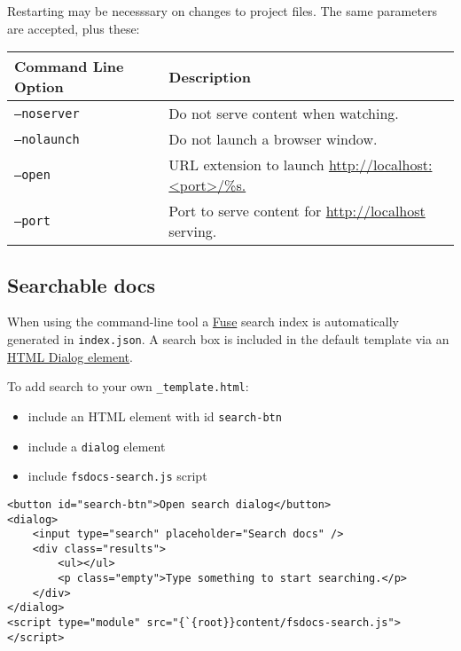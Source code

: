 \documentclass{article}
\begin{document}
Restarting may be necesssary on changes to project files. The same parameters are accepted, plus these:
\begin{tabular}{|l|l|}\hline
\textbf{Command Line Option} & \textbf{Description}\\ \hline\hline
\texttt{--noserver} & Do not serve content when watching.\\ \hline
\texttt{--nolaunch} & Do not launch a browser window.\\ \hline
\texttt{--open} & URL extension to launch \href{http://localhost:<port>/\%s.}{http://localhost:<port>/\%s.}\\ \hline
\texttt{--port} & Port to serve content for \href{http://localhost}{http://localhost} serving.\\ \hline
\end{tabular}

\subsection*{Searchable docs}



When using the command-line tool a \href{https://www.fusejs.io/}{Fuse} search index is automatically generated in \texttt{index.json}.
A search box is included in the default template via an \href{https://developer.mozilla.org/docs/Web/HTML/Element/dialog}{HTML Dialog element}.

To add search to your own \texttt{\_template.html}:
\begin{itemize}
\item include an HTML element with id \texttt{search-btn}

\item include a \texttt{dialog} element

\item include \texttt{fsdocs-search.js} script

\end{itemize}

\begin{lstlisting}
<button id="search-btn">Open search dialog</button>
<dialog>
    <input type="search" placeholder="Search docs" />
    <div class="results">
        <ul></ul>
        <p class="empty">Type something to start searching.</p>
    </div>
</dialog>
<script type="module" src="{`{root}}content/fsdocs-search.js"></script>

\end{lstlisting}
\end{document}
